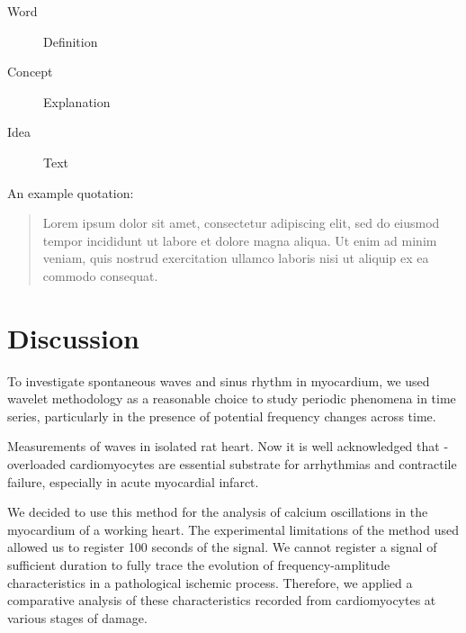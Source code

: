 \documentclass{biophys-new}
\begin{document}


\begin{description}
\item[Word] Definition
\item[Concept] Explanation
\item[Idea] Text
\end{description}

An example quotation:

\begin{quote}
Lorem ipsum dolor sit amet, consectetur adipiscing elit, sed do eiusmod tempor incididunt ut labore et dolore magna aliqua. Ut enim ad minim veniam, quis nostrud exercitation ullamco laboris nisi ut aliquip ex ea commodo consequat.
\end{quote}


\section*{Discussion}

To investigate spontaneous  waves and sinus rhythm in myocardium, we
used wavelet methodology as a reasonable choice to study periodic phenomena in time series, particularly in the presence of potential frequency changes across time.

Measurements of  waves in isolated rat heart.
Now it is well acknowledged that  - overloaded cardiomyocytes are essential substrate for arrhythmias and contractile failure, especially in acute myocardial infarct.

We decided to use this method for the analysis of calcium oscillations in the myocardium of a working heart.
The experimental limitations of the method used allowed us to register 100 seconds of the signal.
We cannot register a signal of sufficient duration to fully trace the evolution of frequency-amplitude characteristics in a pathological ischemic process.
Therefore, we applied a comparative analysis of these characteristics recorded from cardiomyocytes at various stages of damage.
\end{document}
